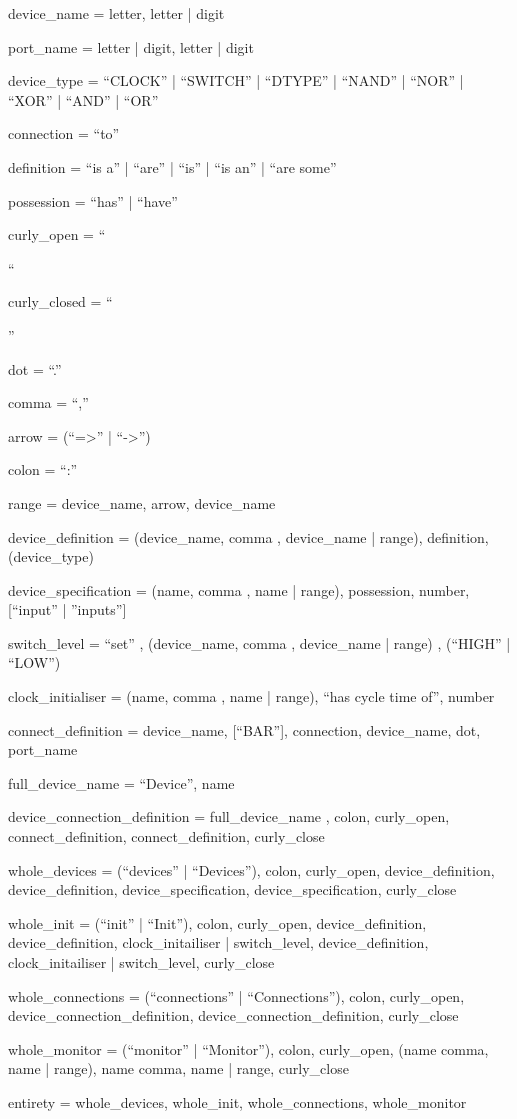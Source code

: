 \documentclass[12pt]{article}
\begin{document}
\begin{spverbatim}
device_name =  letter, {letter | digit}

port_name = letter | digit, {letter | digit}

device_type = “CLOCK” | “SWITCH” | “DTYPE” | “NAND” | “NOR” | “XOR” | “AND” | “OR”

connection = “to”

definition = “is a” | “are” | “is” | “is an” | “are some”

possession = “has” | “have”

curly_open = “{“

curly_closed = “}”

dot =  “.”

comma = “,”

arrow = (“=>” | “->”)

colon = “:”

range = device_name, arrow, device_name

device_definition = (device_name, {comma , device_name} | range), definition, (device_type)

device_specification = (name, {comma , name} | range), possession, number, [“input” | ”inputs”]

switch_level = “set” , (device_name, {comma , device_name} | range) , (“HIGH” | “LOW”)

clock_initialiser = (name, {comma , name} | range), “has cycle time of”, number

connect_definition = device_name, [“BAR”], connection, device_name, dot, port_name

full_device_name = “Device”, name

device_connection_definition = full_device_name , colon, curly_open, connect_definition, {connect_definition}, curly_close

whole_devices = (“devices” | “Devices”), colon, curly_open, device_definition, {device_definition}, device_specification, {device_specification}, curly_close

whole_init = (“init” | “Init”), colon, curly_open, device_definition, {device_definition}, {clock_initailiser | switch_level}, {device_definition}, {clock_initailiser | switch_level}, curly_close

whole_connections = (“connections” | “Connections”), colon, curly_open, device_connection_definition, {device_connection_definition}, curly_close

whole_monitor = (“monitor” | “Monitor”), colon, curly_open, (name {comma, name} | range), {name {comma, name} | range}, curly_close

entirety = whole_devices, whole_init, whole_connections, whole_monitor

\end{spverbatim}
\end{document}
